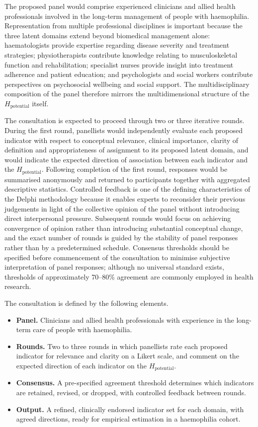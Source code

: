 The proposed panel would comprise experienced clinicians and allied health professionals involved in the long-term management of people with haemophilia. Representation from multiple professional disciplines is important because the three latent domains extend beyond biomedical management alone: haematologists provide expertise regarding disease severity and treatment strategies; physiotherapists contribute knowledge relating to musculoskeletal function and rehabilitation; specialist nurses provide insight into treatment adherence and patient education; and psychologists and social workers contribute perspectives on psychosocial wellbeing and social support. The multidisciplinary composition of the panel therefore mirrors the multidimensional structure of the $H_{\text{potential}}$ itself.

The consultation is expected to proceed through two or three iterative rounds. During the first round, panellists would independently evaluate each proposed indicator with respect to conceptual relevance, clinical importance, clarity of definition and appropriateness of assignment to its proposed latent domain, and would indicate the expected direction of association between each indicator and the $H_{\text{potential}}$. Following completion of the first round, responses would be summarised anonymously and returned to participants together with aggregated descriptive statistics. Controlled feedback is one of the defining characteristics of the Delphi methodology because it enables experts to reconsider their previous judgements in light of the collective opinion of the panel without introducing direct interpersonal pressure. Subsequent rounds would focus on achieving convergence of opinion rather than introducing substantial conceptual change, and the exact number of rounds is guided by the stability of panel responses rather than by a predetermined schedule. Consensus thresholds should be specified before commencement of the consultation to minimise subjective interpretation of panel responses; although no universal standard exists, thresholds of approximately 70--80\% agreement are commonly employed in health research.

The consultation is defined by the following elements.

\begin{itemize}
  \item \textbf{Panel.} Clinicians and allied health professionals with experience in the long-term care of people with haemophilia.
  \item \textbf{Rounds.} Two to three rounds in which panellists rate each proposed indicator for relevance and clarity on a Likert scale, and comment on the expected direction of each indicator on the $H_{\text{potential}}$.
  \item \textbf{Consensus.} A pre-specified agreement threshold determines which indicators are retained, revised, or dropped, with controlled feedback between rounds.
  \item \textbf{Output.} A refined, clinically endorsed indicator set for each domain, with agreed directions, ready for empirical estimation in a haemophilia cohort.
\end{itemize}

